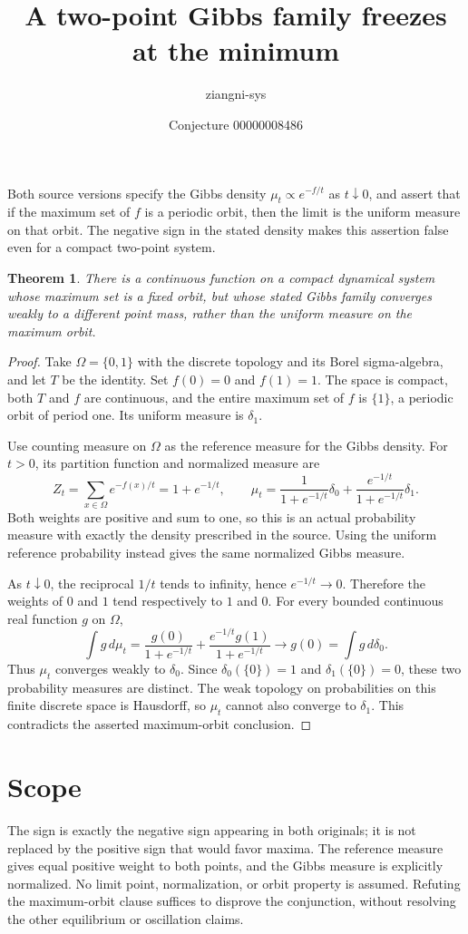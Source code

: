 \documentclass[11pt]{article}
\title{A two-point Gibbs family freezes at the minimum}
\author{ziangni-sys}
\date{Conjecture 00000008486}
\newtheorem{theorem}{Theorem}
\begin{document}
\sloppy
\maketitle
\noindent Both source versions specify the Gibbs density
$\mu_t\propto e^{-f/t}$ as $t\downarrow0$, and assert that if the maximum
set of $f$ is a periodic orbit, then the limit is the uniform measure on
that orbit. The negative sign in the stated density makes this assertion
false even for a compact two-point system.

\begin{theorem}
There is a continuous function on a compact dynamical system whose maximum
set is a fixed orbit, but whose stated Gibbs family converges weakly to a
different point mass, rather than the uniform measure on the maximum orbit.
\end{theorem}
\begin{proof}
Take $\Omega=\{0,1\}$ with the discrete topology and its Borel sigma-algebra,
and let $T$ be the identity. Set $f(0)=0$ and $f(1)=1$. The space is compact,
both $T$ and $f$ are continuous, and the entire maximum set of $f$ is
$\{1\}$, a periodic orbit of period one. Its uniform measure is $\delta_1$.

Use counting measure on $\Omega$ as the reference measure for the Gibbs
density. For $t>0$, its partition function and normalized measure are
\[
 Z_t=\sum_{x\in\Omega}e^{-f(x)/t}=1+e^{-1/t},\qquad
 \mu_t=\frac{1}{1+e^{-1/t}}\delta_0+
       \frac{e^{-1/t}}{1+e^{-1/t}}\delta_1.
\]
Both weights are positive and sum to one, so this is an actual probability
measure with exactly the density prescribed in the source. Using the uniform
reference probability instead gives the same normalized Gibbs measure.

As $t\downarrow0$, the reciprocal $1/t$ tends to infinity, hence
$e^{-1/t}\to0$. Therefore the weights of $0$ and $1$ tend respectively to
$1$ and $0$. For every bounded continuous real function $g$ on $\Omega$,
\[
 \int g\,d\mu_t
 =\frac{g(0)}{1+e^{-1/t}}+
   \frac{e^{-1/t}g(1)}{1+e^{-1/t}}
 \longrightarrow g(0)=\int g\,d\delta_0.
\]
Thus $\mu_t$ converges weakly to $\delta_0$. Since
$\delta_0(\{0\})=1$ and $\delta_1(\{0\})=0$, these two probability
measures are distinct. The weak topology on probabilities on this finite
discrete space is Hausdorff, so $\mu_t$ cannot also converge to $\delta_1$.
This contradicts the asserted maximum-orbit conclusion.
\end{proof}

\section*{Scope}
The sign is exactly the negative sign appearing in both originals; it is
not replaced by the positive sign that would favor maxima. The reference
measure gives equal positive weight to both points, and the Gibbs measure
is explicitly normalized. No limit point, normalization, or orbit property
is assumed. Refuting the maximum-orbit clause suffices to disprove the
conjunction, without resolving the other equilibrium or oscillation claims.
\end{document}
